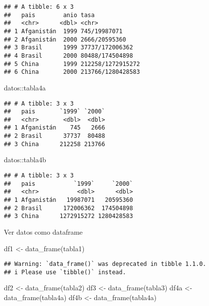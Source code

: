 \documentclass[
]{article}
\newenvironment{Shaded}{\begin{snugshade}}{\end{snugshade}}
\newcommand{\FunctionTok}[1]{\textcolor[rgb]{0.00,0.00,0.00}{#1}}
\newcommand{\NormalTok}[1]{#1}
\newcommand{\OtherTok}[1]{\textcolor[rgb]{0.56,0.35,0.01}{#1}}
\newcommand{\SpecialCharTok}[1]{\textcolor[rgb]{0.00,0.00,0.00}{#1}}
\begin{document}
\begin{verbatim}
## # A tibble: 6 x 3
##   pais        anio tasa             
##   <chr>      <dbl> <chr>            
## 1 Afganistán  1999 745/19987071     
## 2 Afganistán  2000 2666/20595360    
## 3 Brasil      1999 37737/172006362  
## 4 Brasil      2000 80488/174504898  
## 5 China       1999 212258/1272915272
## 6 China       2000 213766/1280428583
\end{verbatim}

\begin{Shaded}
\begin{Highlighting}[]
\NormalTok{datos}\SpecialCharTok{::}\NormalTok{tabla4a}
\end{Highlighting}
\end{Shaded}

\begin{verbatim}
## # A tibble: 3 x 3
##   pais       `1999` `2000`
##   <chr>       <dbl>  <dbl>
## 1 Afganistán    745   2666
## 2 Brasil      37737  80488
## 3 China      212258 213766
\end{verbatim}

\begin{Shaded}
\begin{Highlighting}[]
\NormalTok{datos}\SpecialCharTok{::}\NormalTok{tabla4b}
\end{Highlighting}
\end{Shaded}

\begin{verbatim}
## # A tibble: 3 x 3
##   pais           `1999`     `2000`
##   <chr>           <dbl>      <dbl>
## 1 Afganistán   19987071   20595360
## 2 Brasil      172006362  174504898
## 3 China      1272915272 1280428583
\end{verbatim}

Ver datos como dataframe

\begin{Shaded}
\begin{Highlighting}[]
\NormalTok{df1 }\OtherTok{\textless{}{-}} \FunctionTok{data\_frame}\NormalTok{(tabla1)}
\end{Highlighting}
\end{Shaded}

\begin{verbatim}
## Warning: `data_frame()` was deprecated in tibble 1.1.0.
## i Please use `tibble()` instead.
\end{verbatim}

\begin{Shaded}
\begin{Highlighting}[]
\NormalTok{df2 }\OtherTok{\textless{}{-}} \FunctionTok{data\_frame}\NormalTok{(tabla2)}
\NormalTok{df3 }\OtherTok{\textless{}{-}} \FunctionTok{data\_frame}\NormalTok{(tabla3)}
\NormalTok{df4a }\OtherTok{\textless{}{-}} \FunctionTok{data\_frame}\NormalTok{(tabla4a)}
\NormalTok{df4b }\OtherTok{\textless{}{-}} \FunctionTok{data\_frame}\NormalTok{(tabla4a)}
\end{Highlighting}
\end{Shaded}
\end{document}
